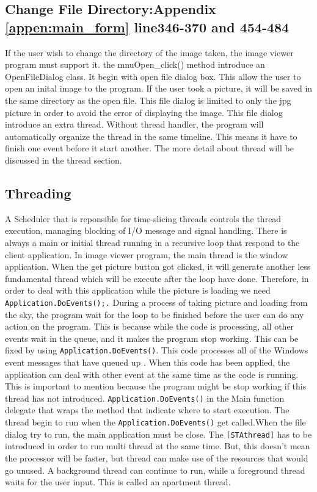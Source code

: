 \subsection{Change File Directory:Appendix \ref{appen:main_form} line346-370 and 454-484 }%
If the user wish to change the directory of the image taken, the image viewer program must support it. the mnuOpen\_click() method introduce an OpenFileDialog class. It begin with open file dialog box. This allow the user to open an inital image to the program. If the user took a picture, it will be saved in the same directory as the open file. This file dialog is limited to only the jpg picture in order to avoid the error of displaying the image. 
This file dialog introduce an extra thread. Without thread handler, the program will automatically organize the thread in the same timeline. This means it have to finish one event before it start another. The more detail about thread will be discussed in the thread section. 

\subsection{Threading}

A Scheduler that is reponsible for time-slicing threads controls the thread execution, managing blocking of I/O message and signal handling. There is always a main or initial thread running in a recursive loop that respond to the client application\cite{keithC}. In image viewer program, the main thread is the window application. When the get picture button got clicked, it will generate another less fundamental thread which will be execute after the loop have done. Therefore, in order to deal with this application while the picture is loading we need \texttt{Application.DoEvents();.}
During a process of taking picture and loading from the sky, the program wait for the loop to be finished before the user can do any action on the program. This is because while the code is processing, all other events wait in the queue, and it makes the program stop working. This can be fixed by using \texttt{Application.DoEvents()}. This code processes all of the Windows event messages that have queued up \cite{davidW}. When this code has been applied, the application can deal with other event at the same time as the code is running. This is important to mention because the program might be stop working if this thread has not introduced.
        \texttt{Application.DoEvents()} in the Main function delegate that wraps the method that indicate where to start execution. The thread begin to run when the \texttt{Application.DoEvents()} get called\cite{xieX}.When the file dialog try to run, the main application must be close. The \texttt{[STAthread]} has to be introduced in order to run multi thread at the same time. But, this doesn't mean the processor will be faster, but thread can make use of the resources that would go unused. A background thread can continue to run, while a foreground thread waits for the user input. This is called an apartment thread. 
        
